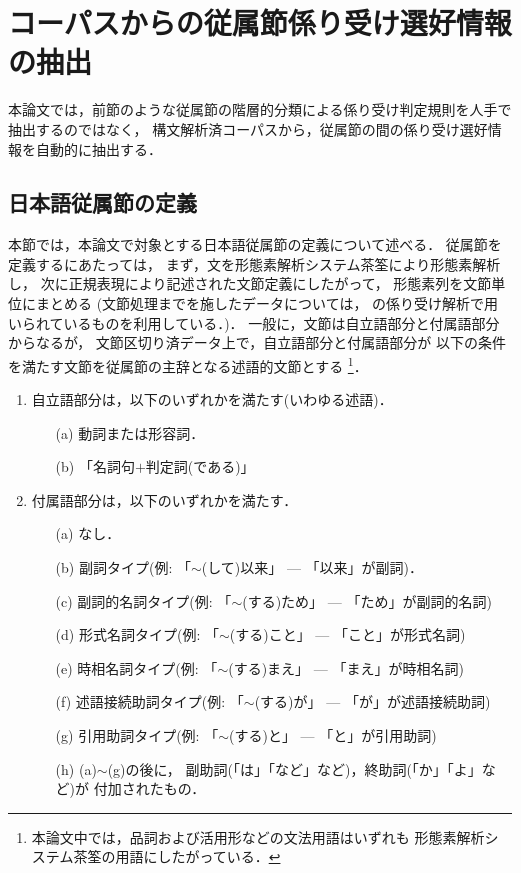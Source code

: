 \section{コーパスからの従属節係り受け選好情報の抽出}
\label{sec:learn}

本論文では，前節のような従属節の階層的分類による係り受け判定規則を人手で抽出するのではなく，
構文解析済コーパスから，従属節の間の係り受け選好情報を自動的に抽出する．

\subsection{日本語従属節の定義}
\label{subsec:dataex}

本節では，本論文で対象とする日本語従属節の定義について述べる．
従属節を定義するにあたっては，
まず，文を形態素解析システム茶筌\cite{Matsumoto97aj}により形態素解析し，
次に正規表現により記述された文節定義にしたがって，
形態素列を文節単位にまとめる
(文節処理までを施したデータについては，
\cite{Fujio97aj,Fujio99aj}の係り受け解析で用いられているものを利用している．)．
一般に，文節は自立語部分と付属語部分からなるが，
文節区切り済データ上で，自立語部分と付属語部分が
以下の条件を満たす文節を従属節の主辞となる述語的文節とする
\footnote{
        本論文中では，品詞および活用形などの文法用語はいずれも
        形態素解析システム茶筌\cite{Matsumoto97aj}の用語にしたがっている．
}．
\begin{enumerate}
  \item 自立語部分は，以下のいずれかを満たす(いわゆる述語)．
        \begin{enumerate}
          \item[(a)] 動詞または形容詞．
          \item[(b)] 「名詞句$+$判定詞(である)」
        \end{enumerate}
  \item 付属語部分は，以下のいずれかを満たす．
        \begin{enumerate}
          \item[(a)] なし．
          \item[(b)] 副詞タイプ(例: 「$\sim$(して)以来」
                --- 「以来」が副詞)．
          \item[(c)] 副詞的名詞タイプ(例: 「$\sim$(する)ため」
                --- 「ため」が副詞的名詞)
          \item[(d)] 形式名詞タイプ(例: 「$\sim$(する)こと」
                --- 「こと」が形式名詞)
          \item[(e)] 時相名詞タイプ(例: 「$\sim$(する)まえ」
                --- 「まえ」が時相名詞)
          \item[(f)] 述語接続助詞タイプ(例: 「$\sim$(する)が」
                --- 「が」が述語接続助詞)
          \item[(g)] 引用助詞タイプ(例: 「$\sim$(する)と」
                --- 「と」が引用助詞)
          \item[(h)] (a)$\sim$(g)の後に，
                副助詞(「は」「など」など)，終助詞(「か」「よ」など)が
                付加されたもの．
        \end{enumerate}
\end{enumerate}
